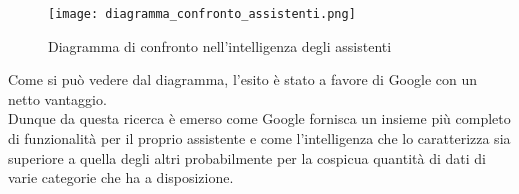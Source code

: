 \begin{figure}[htbp]
	\begin{center}
		\texttt{[image: diagramma\_confronto\_assistenti.png]}
		\caption{Diagramma di confronto nell'intelligenza degli assistenti}
	\end{center}
\end{figure}


Come si può vedere dal diagramma, l'esito è stato a favore di Google con un netto vantaggio. \\
Dunque da questa ricerca è emerso come Google fornisca un insieme più completo di funzionalità per il proprio assistente e come l'intelligenza che lo caratterizza sia superiore a quella degli altri probabilmente per la cospicua quantità di dati di varie categorie che ha a disposizione. 
